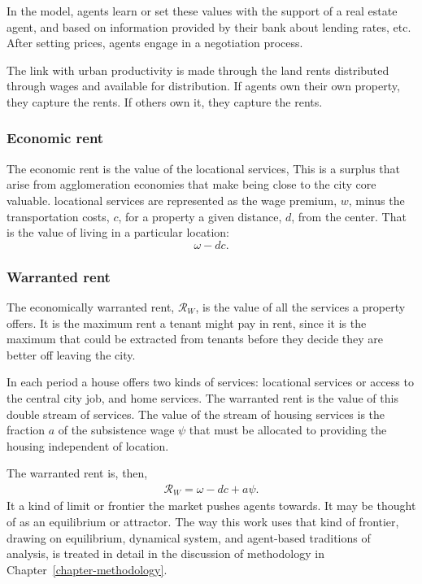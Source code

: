 In the model, agents learn or set these values with the support of a real estate agent, and based on information provided by their bank about lending rates, etc. After setting prices, agents engage in a negotiation process. 

The link with urban productivity is made through the land rents distributed through wages and available for distribution. If agents own their own property, they capture the rents. If others own it, they capture the rents.


\subsubsection{Economic rent} \label{section-economic-rent}
The economic rent is the value of the locational services, 
This is a surplus that arise from agglomeration economies that make being close to the city core valuable. \Gls{locational services} are represented as %
the wage premium, $w$, minus the transportation costs, $c$, for a property a given distance, $d$, from the center. That is the value of living in a particular location:
\[\omega- {dc}.\]


\subsubsection{Warranted rent} \label{section-waranted-rent}

The economically \gls{warranted rent}, $\mathcal{R}_W$, is the value of all  the services a property offers. %
It is the maximum rent  a tenant might pay in rent, since it is the maximum that could be extracted from tenants before they decide they are better off leaving the city.  

In each period a house offers two kinds of services: {locational services} or  access to the central city job, and {home services}.  The {warranted rent} is the value of this double stream of services.  The value of the stream of housing services is the fraction $a$ of the subsistence wage $\psi$ that must be allocated to providing the housing independent of location. 

 The warranted rent is, then, 
\begin{align}
\mathcal{R}_W=\omega- {dc} + a\psi.
\label{eqn-warranted-rent}
\end{align}
 It a kind of limit or \gls{frontier} the market pushes agents towards. It may be thought of as an \gls{equilibrium} or \gls{attractor}. The way this work uses that kind of frontier, drawing on \gls{equilibrium}, \gls{dynamical system}, and \gls{agent-based} traditions of analysis, is treated in detail in the discussion of methodology in Chapter~\ref{chapter-methodology}.

